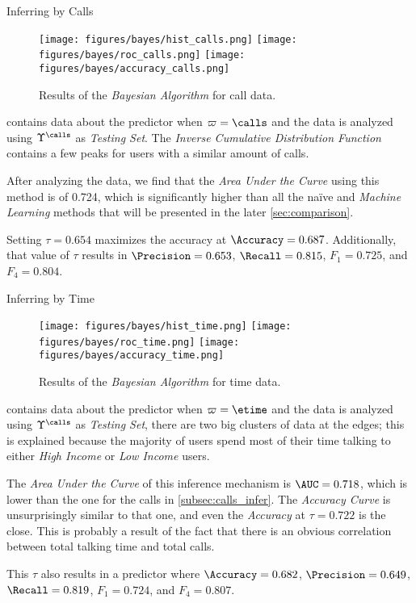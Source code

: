 \documentclass{beamer}
\begin{document}
\begin{frame}{Inferring by Calls}

	\begin{figure}
		\centering
		\texttt{[image: figures/bayes/hist\_calls.png]}
		\texttt{[image: figures/bayes/roc\_calls.png]}
		\texttt{[image: figures/bayes/accuracy\_calls.png]}
		\caption{Results of the \emph{Bayesian Algorithm} for call data.}
	\end{figure}

	 contains data about the predictor when $\varpi = \calls$ and the data is analyzed using $\Upsilon^{\calls}$ as \emph{Testing Set}. The \emph{Inverse Cumulative Distribution Function} contains a few peaks for users with a similar amount of calls.

	After analyzing the data, we find that the \emph{Area Under the Curve} using this method is of \num{0.724}, which is significantly higher than all the naïve and \emph{Machine Learning} methods that will be presented in the later \cref{sec:comparison}.

	Setting $\tau = 0.654$ maximizes the accuracy at $\Accuracy = 0.687$. Additionally, that value of $\tau$ results in $\Precision = 0.653$, $\Recall = 0.815$, $F_1 = 0.725$, and $F_4 = 0.804$.

\end{frame}

\begin{frame}{Inferring by Time}

	\begin{figure}[h]
		\centering
		\texttt{[image: figures/bayes/hist\_time.png]}
		\texttt{[image: figures/bayes/roc\_time.png]}
		\texttt{[image: figures/bayes/accuracy\_time.png]}
		\caption{Results of the \emph{Bayesian Algorithm} for time data.}
	\end{figure}

	 contains data about the predictor when $\varpi = \etime$ and the data is analyzed using $\Upsilon^{\calls}$ as \emph{Testing Set}, there are two big clusters of data at the edges; this is explained because the majority of users spend most of their time talking to either \emph{High Income} or \emph{Low Income} users.

	The \emph{Area Under the Curve} of this inference mechanism is $\AUC = 0.718$, which is lower than the one for the calls in \cref{subsec:calls_infer}. The \emph{Accuracy Curve} is unsurprisingly similar to that one, and even the \emph{Accuracy} at $\tau = 0.722$ is the close. This is probably a result of the fact that there is an obvious correlation between total talking time and total calls.

	This $\tau$ also results in a predictor where $\Accuracy = 0.682$, $\Precision = 0.649$, $\Recall = 0.819$, $F_1 = 0.724$, and $F_4 = 0.807$.

\end{frame}
\end{document}
